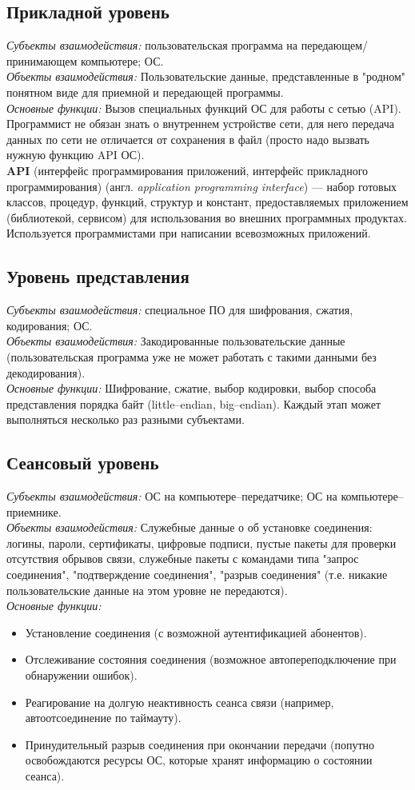 \subsection{Прикладной уровень}
\emph{Субъекты взаимодействия:} пользовательская программа на передающем/принимающем компьютере; ОС.
\\\emph{Объекты взаимодействия:} Пользовательские данные, представленные в "родном" понятном виде для приемной и передающей программы.
\\\emph{Основные функции:} Вызов специальных функций ОС для работы с сетью (API). Программист не обязан знать о внутреннем устройстве
сети, для него передача данных по сети не отличается от сохранения в файл (просто надо вызвать нужную функцию API ОС).
\\\textbf{API} (интерфейс программирования приложений, интерфейс прикладного программирования) (англ. \emph{application programming interface}) — набор готовых классов, процедур, функций, структур и констант, предоставляемых приложением (библиотекой, сервисом) для использования во внешних программных продуктах. Используется программистами при написании всевозможных приложений.
\subsection{Уровень представления}
\emph{Субъекты взаимодействия:} специальное ПО для шифрования, сжатия, кодирования; ОС.
\\\emph{Объекты взаимодействия:} Закодированные пользовательские данные (пользовательская программа уже не может работать с такими данными без декодирования).
\\\emph{Основные функции:} Шифрование, сжатие, выбор кодировки, выбор способа представления порядка байт (little--endian, big--endian).
Каждый этап может выполняться несколько раз разными субъектами.
\subsection{Сеансовый уровень}
\emph{Субъекты взаимодействия:} ОС на компьютере--передатчике; ОС на компьютере--приемнике.
\\\emph{Объекты взаимодействия:} Служебные данные о об установке соединения: логины, пароли, сертификаты, цифровые подписи, пустые пакеты для проверки отсутствия обрывов связи, служебные пакеты с командами типа "запрос соединения", "подтверждение соединения", "разрыв соединения" (т.е. никакие пользовательские данные на этом уровне не передаются).
\\\emph{Основные функции:}
\begin{itemize}
\item Установление соединения (с возможной аутентификацией абонентов).
\item Отслеживание состояния соединения (возможное автопереподключение при обнаружении ошибок).
\item Реагирование на долгую неактивность сеанса связи (например, автоотсоединение по таймауту).
\item Принудительный разрыв соединения при окончании передачи (попутно освобождаются ресурсы ОС, которые хранят информацию о состоянии сеанса).
\end{itemize}
